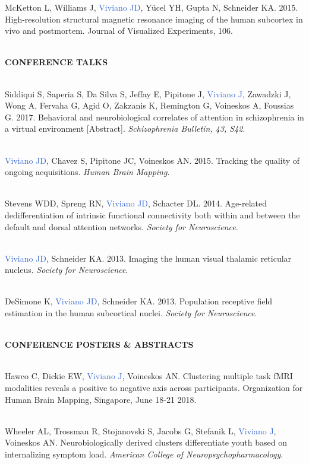 \documentclass[a4paper,11pt,oneside]{book}
\newcommand\sectionheading{
    \normalsize
    \noindent
    \leftskip=0in
    \textbf
}
\begin{document}
\begin{flushleft}
McKetton L, Williams J, \textcolor{highlight}{Viviano JD}, Yücel YH, Gupta N, Schneider KA. 2015. High-resolution structural magnetic resonance imaging of the human subcortex in vivo and postmortem. Journal of Visualized Experiments, 106. \\\

\sectionheading{CONFERENCE TALKS} \\\

Siddiqui S, Saperia S, Da Silva S, Jeffay E, Pipitone J, \textcolor{highlight}{Viviano J}, Zawadzki J, Wong A, Fervaha G, Agid O, Zakzanis K, Remington G, Voineskos A, Foussias G. 2017. Behavioral and neurobiological correlates of attention in schizophrenia in a virtual environment [Abstract]. \textit{Schizophrenia Bulletin, 43, S42}. \\\

\textcolor{highlight}{Viviano JD}, Chavez S, Pipitone JC, Voineskos AN. 2015. Tracking the quality of ongoing acquisitions. \textit{Human Brain Mapping}. \\\

Stevens WDD, Spreng RN, \textcolor{highlight}{Viviano JD}, Schacter DL. 2014. Age-related dedifferentiation of intrinsic functional connectivity both within and between the default and dorsal attention networks. \textit{Society for Neuroscience}. \\\

\textcolor{highlight}{Viviano JD}, Schneider KA. 2013. Imaging the human visual thalamic reticular nucleus. \textit{Society for Neuroscience}. \\\

DeSimone K, \textcolor{highlight}{Viviano JD}, Schneider KA. 2013. Population receptive field estimation in the human subcortical nuclei. \textit{Society for Neuroscience}. \\\

\sectionheading{CONFERENCE POSTERS \& ABSTRACTS} \\\

Hawco C, Dickie EW, \textcolor{highlight}{Viviano J}, Voineskos AN. Clustering multiple task fMRI modalities reveals a positive to negative axis across participants. Organization for Human Brain Mapping, Singapore, June 18-21 2018. \\\

Wheeler AL, Trossman R, Stojanovski S, Jacobs G, Stefanik L, \textcolor{highlight}{Viviano J}, Voineskos AN. Neurobiologically derived clusters differentiate youth based on internalizing symptom load. \textit{American College of Neuropsychopharmacology}. \\\


\end{flushleft}
\end{document}
